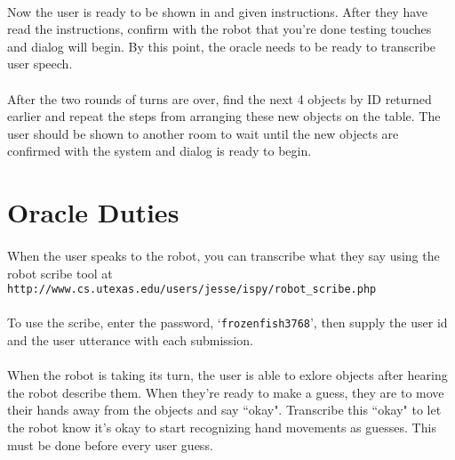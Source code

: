 \documentclass{article}
\begin{document}
\paragraph{} Now the user is ready to be shown in and given instructions. After they have read the instructions, confirm with the robot that you're done testing touches and dialog will begin. By this point, the oracle needs to be ready to transcribe user speech.

\paragraph{} After the two rounds of turns are over, find the next 4 objects by ID returned earlier and repeat the steps from arranging these new objects on the table. The user should be shown to another room to wait until the new objects are confirmed with the system and dialog is ready to begin.

\section{Oracle Duties}

\paragraph{} When the user speaks to the robot, you can transcribe what they say using the robot scribe tool at \texttt{http://www.cs.utexas.edu/users/jesse/ispy/robot\_scribe.php}

\paragraph{} To use the scribe, enter the password, `\texttt{frozenfish3768}', then supply the user id and the user utterance with each submission.

\paragraph{} When the robot is taking its turn, the user is able to exlore objects after hearing the robot describe them. When they're ready to make a guess, they are to move their hands away from the objects and say ``okay". Transcribe this ``okay" to let the robot know it's okay to start recognizing hand movements as guesses. This must be done before every user guess.
\end{document}
